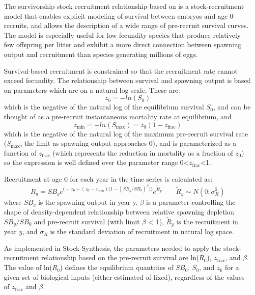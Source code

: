 \hypertarget{Survivorship}{}
The survivorship stock recruitment relationship based on \citet{taylor-stockrecruitment-2013} is a stock-recruitment model that enables explicit modeling of survival between embryos and age 0 recruits, and allows the description of a wide range of pre-recruit survival curves.  The model is especially useful for low fecundity species that produce relatively few offspring per litter and exhibit a more direct connection between spawning output and recruitment than species generating millions of eggs.

Survival-based recruitment is constrained so that the recruitment rate cannot exceed fecundity. The relationship between survival and spawning output is based on parameters which are on a natural log scale. These are:
\begin{equation}
z_0=-ln(S_0)
\end{equation} 
which is the negative of the natural log of the equilibrium survival $S_0$, and can be thought of as a pre-recruit instantaneous mortality rate at equilibrium, and
\begin{equation}
z_{\text{min}}=-ln(S_{\text{max}})=z_0(1-z_{\text{frac}})
\end{equation}
which is the negative of the natural log of the maximum pre-recruit survival rate ($S_{\text{max}}$, the limit as spawning output approaches 0), and is parameterized as a function of $z_{\text{frac}}$ (which represents the reduction in mortality as a fraction of $z_0$) so the expression is well defined over the parameter range 0<$z_{\text{frac}}$<1.

Recruitment at age 0 for each year in the time series is calculated as:
\begin{equation}{ R_y = SB_ye^{\Big(-z_0 + (z_0-z_{min})\big(1-(SB_y/SB_0)^\beta \big)\Big)}e^{\tilde{R}_y}\qquad  \tilde{R}_y\sim N(0;\sigma^2_R)}
\end{equation}
where $SB_y$ is the spawning output in year y,  $\beta$ is a parameter controlling the shape of density-dependent relationship between relative spawning depletion $SB_y/SB_0$ and pre-recruit survival (with limit $\beta$ < 1), $\tilde{R}_y$ is the recruitment in year $y$, and $\sigma_R$ is the standard deviation of recruitment in natural log space. 

As implemented in Stock Synthesis, the parameters needed to apply the stock-recruitment relationship based on the pre-recruit survival are ln($R_0$), $z_{\text{frac}}$, and $\beta$. The value of ln($R_0$) defines the equilibrium quantities of $SB_0$, $S_0$, and $z_0$ for a given set of biological inputs (either estimated of fixed), regardless of the values of $z_{\text{frac}}$ and $\beta$.

